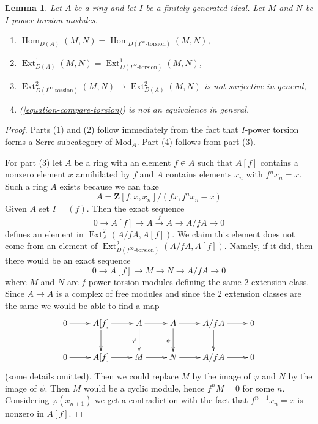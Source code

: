 \documentclass{stacks-project}
\theoremstyle{plain}
\newtheorem{lemma}[subsection]{Lemma}
\theoremstyle{definition}
\theoremstyle{remark}
\numberwithin{equation}{subsection}
\def\Hom{\mathop{\mathrm{Hom}}\nolimits}
\def\Ext{\mathop{\mathrm{Ext}}\nolimits}
\begin{document}
\begin{lemma}
\label{lemma-not-equal}
Let $A$ be a ring and let $I$ be a finitely generated ideal.
Let $M$ and $N$ be $I$-power torsion modules.
\begin{enumerate}
\item $\Hom_{D(A)}(M, N) = \Hom_{D({I^\infty\text{-torsion}})}(M, N)$,
\item $\Ext^1_{D(A)}(M, N) =
\Ext^1_{D({I^\infty\text{-torsion}})}(M, N)$,
\item $\Ext^2_{D({I^\infty\text{-torsion}})}(M, N) \to
\Ext^2_{D(A)}(M, N)$ is not surjective in general,
\item (\ref{equation-compare-torsion}) is not an equivalence in general.
\end{enumerate}
\end{lemma}

\begin{proof}
Parts (1) and (2) follow immediately from the fact that $I$-power torsion
forms a Serre subcategory of $\text{Mod}_A$. Part (4) follows from
part (3).

\medskip\noindent
For part (3) let $A$ be a ring with an element $f \in A$ such that
$A[f]$ contains a nonzero element $x$ annihilated by $f$ and
$A$ contains elements $x_n$ with $f^nx_n = x$. Such a ring $A$
exists because we can take
$$
A = \mathbf{Z}[f, x, x_n]/(fx, f^nx_n - x)
$$
Given $A$ set $I = (f)$. Then the exact sequence
$$
0 \to A[f] \to A \xrightarrow{f} A \to A/fA \to 0
$$
defines an element in $\Ext^2_A(A/fA, A[f])$. We claim this
element does not come from an element of
$\Ext^2_{D(f^\infty\text{-torsion})}(A/fA, A[f])$.
Namely, if it did, then there would be an exact sequence
$$
0 \to A[f] \to M \to N \to A/fA \to 0
$$
where $M$ and $N$ are $f$-power torsion modules defining the same
$2$ extension class. Since $A \to A$ is a complex of free modules
and since the $2$ extension classes are the same
we would be able to find a map
$$
\xymatrix{
0 \ar[r] &
A[f] \ar[r] \ar[d] &
A \ar[r] \ar[d]_\varphi &
A \ar[r] \ar[d]_\psi &
A/fA \ar[r] \ar[d] & 0 \\
0 \ar[r] &
A[f] \ar[r] &
M \ar[r] &
N \ar[r] &
A/fA \ar[r] & 0
}
$$
(some details omitted). Then we could replace $M$ by the image of
$\varphi$ and $N$ by the image of $\psi$. Then $M$ would be a cyclic
module, hence $f^n M = 0$ for some $n$. Considering $\varphi(x_{n + 1})$
we get a contradiction with the fact that $f^{n + 1}x_n = x$ is
nonzero in $A[f]$.
\end{proof}
\end{document}
